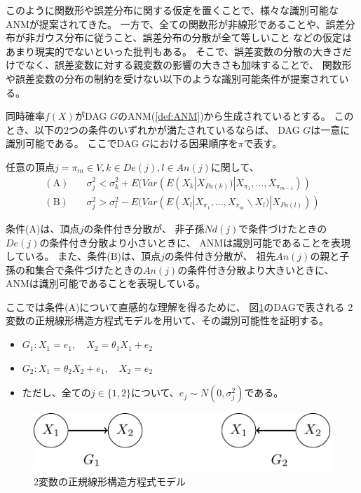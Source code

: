 このように関数形や誤差分布に関する仮定を置くことで、様々な識別可能なANMが提案されてきた。
一方で、全ての関数形が非線形であることや、誤差分布が非ガウス分布に従うこと、誤差分布の分散が全て等しいこと
などの仮定はあまり現実的でないといった批判もある。
そこで、誤差変数の分散の大きさだけでなく、誤差変数に対する親変数の影響の大きさも加味することで、
関数形や誤差変数の分布の制約を受けない以下のような識別可能条件が提案されている\cite{Park2020-ey}。

\begin{theo}
  同時確率$f(X)$がDAG $G$のANM(\ref{def:ANM})から生成されているとする。
  このとき、以下の2つの条件のいずれかが満たされているならば、
  DAG $G$は一意に識別可能である。
  ここでDAG $G$における因果順序を$\pi$で表す。

  任意の頂点$j = \pi_m \in V, k \in De(j), l \in An(j)$に関して、
  \begin{align*}
    (\text{A}) \quad &\sigma_j^2 < \sigma_k^2 + E(\mathit{Var}(E(X_k | X_{Pa(k)}) | X_{\pi_1}, \dots, X_{\pi_{m-1}})) \\
    (\text{B}) \quad &\sigma_j^2 > \sigma_l^2 - E(\mathit{Var}(E(X_l | X_{\pi_1}, \dots, X_{\pi_m} \backslash X_l) | X_{Pa(l)}))
  \end{align*}
\end{theo}

条件(A)は、頂点$j$の条件付き分散が、
非子孫$Nd(j)$で条件づけたときの$De(j)$の条件付き分散より小さいときに、
ANMは識別可能であることを表現している。
また、条件(B)は、頂点$j$の条件付き分散が、
祖先$An(j)$の親と子孫の和集合で条件づけたときの$An(j)$の条件付き分散より大きいときに、
ANMは識別可能であることを表現している。

ここでは条件(A)について直感的な理解を得るために、
図\ref{fig:ex_bivariate_SEM}のDAGで表される
2変数の正規線形構造方程式モデルを用いて、その識別可能性を証明する。

\begin{itemize}
  \item
  $G_1 \colon X_1 = e_1,
   \quad X_2 = \theta_1 X_1 + e_2$

  \item
  $G_2 \colon X_1 = \theta_2 X_2 + e_1,
   \quad X_2 = e_2$

  \item
  ただし、全ての$j \in \{ 1,2 \}$について、$e_j \sim N(0, \sigma_j^2)$である。
\end{itemize}

\begin{figure}[h]
  \centering
  \includegraphics{./picture/bivariate_SEM.pdf}
  \caption{2変数の正規線形構造方程式モデル}
  \label{fig:ex_bivariate_SEM}
\end{figure}


